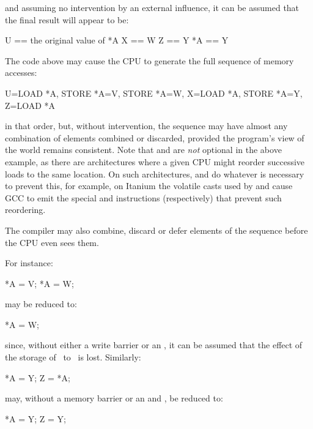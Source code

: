 and assuming no intervention by an external influence, it can be assumed that
the final result will appear to be:

\begin{VerbatimU}
	U == the original value of *A
	X == W
	Z == Y
	*A == Y
\end{VerbatimU}

The code above may cause the CPU to generate the full sequence of memory
accesses:

\begin{VerbatimU}
	U=LOAD *A, STORE *A=V, STORE *A=W, X=LOAD *A, STORE *A=Y, Z=LOAD *A
\end{VerbatimU}

in that order, but, without intervention, the sequence may have almost any
combination of elements combined or discarded, provided the program's view
of the world remains consistent.
Note that  and  are \emph{not} optional
in the above example, as there are architectures where a given CPU might
reorder successive loads to the same location.
On such architectures,  and  do whatever is
necessary to prevent this, for example, on Itanium the volatile casts
used by  and  cause GCC to emit the special
 and  instructions (respectively) that prevent such
reordering.

The compiler may also combine, discard or defer elements of the sequence before
the CPU even sees them.

For instance:

\begin{VerbatimU}
	*A = V;
	*A = W;
\end{VerbatimU}

may be reduced to:

\begin{VerbatimU}
	*A = W;
\end{VerbatimU}

since, without either a write barrier or an , it can be
assumed that the effect of the storage of~ to~ is lost.
Similarly:

\begin{VerbatimU}
	*A = Y;
	Z = *A;
\end{VerbatimU}

may, without a memory barrier or an  and , be
reduced to:

\begin{VerbatimU}
	*A = Y;
	Z = Y;
\end{VerbatimU}

